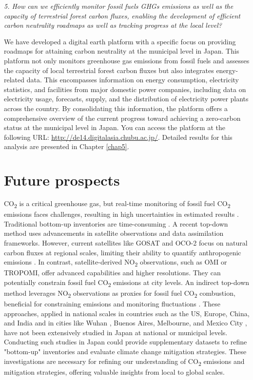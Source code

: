 \textit{5. How can we efficiently monitor fossil fuels GHGs emissions as well as the capacity of terrestrial forest carbon fluxes, enabling the development of efficient carbon neutrality roadmaps as well as tracking progress at the local level?} \par
We have developed a digital earth platform with a specific focus on providing roadmaps for attaining carbon neutrality at the municipal level in Japan. This platform not only monitors greenhouse gas emissions from fossil fuels and assesses the capacity of local terrestrial forest carbon fluxes but also integrates energy-related data. This encompasses information on energy consumption, electricity statistics, and facilities from major domestic power companies, including data on electricity usage, forecasts, supply, and the distribution of electricity power plants across the country. By consolidating this information, the platform offers a comprehensive overview of the current progress toward achieving a zero-carbon status at the municipal level in Japan. You can access the platform at the following URL: \url{http://de14.digitalasia.chubu.ac.jp/}. Detailed results for this analysis are presented in Chapter \ref{chap5}. \par

\section{Future prospects}
CO\textsubscript{2} is a critical greenhouse gas, but real-time monitoring of fossil fuel CO\textsubscript{2} emissions faces challenges, resulting in high uncertainties in estimated results \citep{marland2008uncertainties}. Traditional bottom-up inventories are time-consuming \citep{marland2008uncertainties}. A recent top-down method uses advancements in satellite observations and data assimilation frameworks. However, current satellites like GOSAT and OCO-2 focus on natural carbon fluxes at regional scales, limiting their ability to quantify anthropogenic emissions \citep{nassar2017quantifying, yang2023using}. In contrast, satellite-derived NO\textsubscript{2} observations, such as OMI or TROPOMI, offer advanced capabilities and higher resolutions. They can potentially constrain fossil fuel CO\textsubscript{2} emissions at city levels. An indirect top-down method leverages NO\textsubscript{2} observations as proxies for fossil fuel CO\textsubscript{2} combustion, beneficial for constraining emissions and monitoring fluctuations \citep{ciais2014current, goldberg2019exploiting}. These approaches, applied in national scales in countries such as the US, Europe, China, and India \citep{konovalov2016estimation, zheng2020satellite, miyazaki2023predictability} and in cities like Wuhan \citep{zhang2023quantifying}, Buenos Aires, Melbourne, and Mexico City \citep{yang2023using}, have not been extensively studied in Japan at national or municipal levels. Conducting such studies in Japan could provide supplementary datasets to refine "bottom-up" inventories and evaluate climate change mitigation strategies. These investigations are necessary for refining our understanding of CO\textsubscript{2} emissions and mitigation strategies, offering valuable insights from local to global scales.


